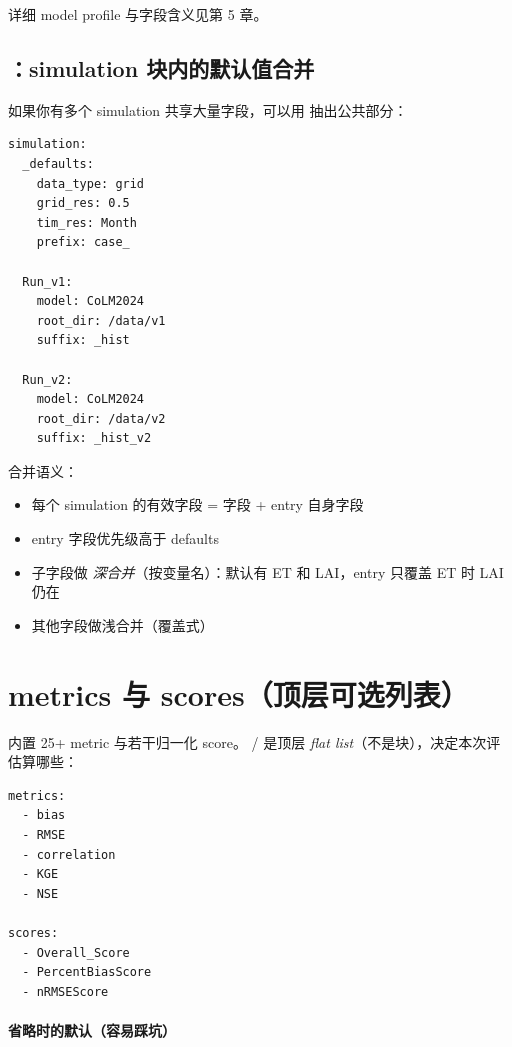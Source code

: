 详细 model profile 与字段含义见第 5 章。

\subsection{：simulation 块内的默认值合并}

如果你有多个 simulation 共享大量字段，可以用  抽出公共部分：

\begin{verbatim}
simulation:
  _defaults:
    data_type: grid
    grid_res: 0.5
    tim_res: Month
    prefix: case_

  Run_v1:
    model: CoLM2024
    root_dir: /data/v1
    suffix: _hist

  Run_v2:
    model: CoLM2024
    root_dir: /data/v2
    suffix: _hist_v2
\end{verbatim}

合并语义：

\begin{itemize}
  \item 每个 simulation 的有效字段 =  字段 + entry 自身字段
  \item entry 字段优先级高于 defaults
  \item {} 子字段做 \emph{深合并}（按变量名）：默认有 ET 和 LAI，entry 只覆盖 ET 时 LAI 仍在
  \item 其他字段做浅合并（覆盖式）
\end{itemize}


\section{metrics 与 scores（顶层可选列表）}

\openbench{} 内置 25+ metric 与若干归一化 score。 /  是顶层 \emph{flat list}（不是块），决定本次评估算哪些：

\begin{verbatim}
metrics:
  - bias
  - RMSE
  - correlation
  - KGE
  - NSE

scores:
  - Overall_Score
  - PercentBiasScore
  - nRMSEScore
\end{verbatim}

\paragraph{省略时的默认（容易踩坑）}

